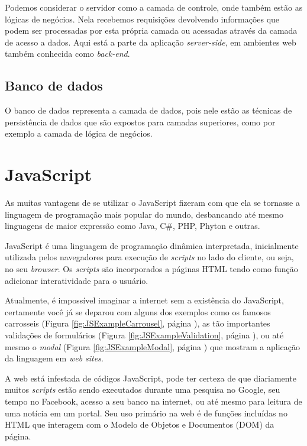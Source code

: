 \documentclass[
	12pt,				%
	openright,			%
	twoside,			%
	a4paper,			%
	english,			%
	brazil				%
	]{abntex2}
\begin{document}
Podemos considerar o servidor como a camada de controle, onde também estão as lógicas de negócios. Nela recebemos requisições devolvendo informações que podem ser processadas por esta própria camada ou acessadas através da camada de acesso a dados. Aqui está a parte da aplicação \textit{server-side}, em ambientes web também conhecida como \textit{back-end}.

\subsection{Banco de dados}

O banco de dados representa a camada de dados, pois nele estão as técnicas de persistência de dados que são expostos para camadas superiores, como por exemplo a camada de lógica de negócios.

\section{JavaScript}

As muitas vantagens de se utilizar o JavaScript fizeram com que ela se tornasse a linguagem de programação mais popular do mundo, desbancando até mesmo linguagens de maior expressão como Java, C\#, PHP, Phyton e outras.

JavaScript é uma linguagem de programação dinâmica interpretada, inicialmente utilizada pelos navegadores para execução de \textit{scripts} no lado do cliente, ou seja, no seu \textit{browser}. Os \textit{scripts} são incorporados a páginas HTML tendo como função adicionar interatividade para o usuário.

Atualmente, é impossível imaginar a internet sem a existência do JavaScript, certamente você já se deparou com alguns dos exemplos como os famosos carrosseis (Figura \ref{fig:JSExampleCarrousel}, página \pageref{fig:JSExampleCarrousel}), as tão importantes validações de formulários (Figura \ref{fig:JSExampleValidation}, página \pageref{fig:JSExampleValidation}), ou até mesmo o \textit{modal} (Figura \ref{fig:JSExampleModal}, página \pageref{fig:JSExampleModal}) que mostram a aplicação da linguagem em \textit{web sites}.

A web está infestada de códigos JavaScript, pode ter certeza de que diariamente muitos \textit{scripts} estão sendo executados durante uma pesquisa no Google, seu tempo no Facebook, acesso a seu banco na internet, ou até mesmo para leitura de uma notícia em um portal. Seu uso primário na web é de funções incluídas no HTML que interagem com o Modelo de Objetos e Documentos (DOM) da página.
\end{document}
